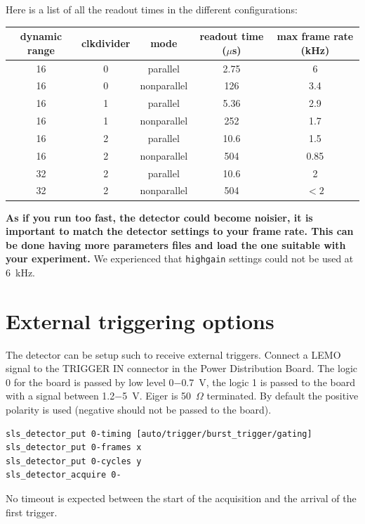 \documentclass{article}
\begin{document}
Here is a list of all the readout times in the different configurations:
\ \\
\begin{tabular}{|c|c|c|c|c|}
\hline
dynamic range & clkdivider & mode & readout time ($\mu$s) & max frame rate (kHz)\\
\hline
16 & 0 & parallel & 2.75 & 6\\
\hline
16 & 0 & nonparallel &  126 & 3.4\\
\hline
16 & 1 & parallel &  5.36 & 2.9\\
\hline
16 & 1 & nonparallel & 252 & 1.7\\
\hline
16 & 2 & parallel &  10.6 & 1.5\\
\hline
16 & 2 & nonparallel & 504 & 0.85\\
\hline
32 & 2 & parallel &  10.6 & 2\\
\hline
32 & 2 & nonparallel & 504 & $<2$\\
\hline
\end{tabular}

\textbf{As if you run too fast, the detector could become noisier, it is important to match the detector settings to your frame rate. This can be done having more parameters files and load the one suitable with your experiment.} We experienced that {\tt{highgain}} settings could not be used at 6~kHz.


\section{External triggering options}
The detector can be setup such to receive external triggers. Connect a LEMO signal to the TRIGGER IN connector in the Power Distribution Board. The logic 0 for the board is passed by low level 0$-$0.7~V, the logic 1 is passed to the board with a signal between 1.2$-$5~V. Eiger is 50~$\Omega$ terminated. By default the positive polarity is used (negative should not be passed to the board).  
\begin{verbatim}
sls_detector_put 0-timing [auto/trigger/burst_trigger/gating]
sls_detector_put 0-frames x
sls_detector_put 0-cycles y
sls_detector_acquire 0-
\end{verbatim}
No timeout is expected between the start of the acquisition and the arrival of the first trigger. 
\end{document}
